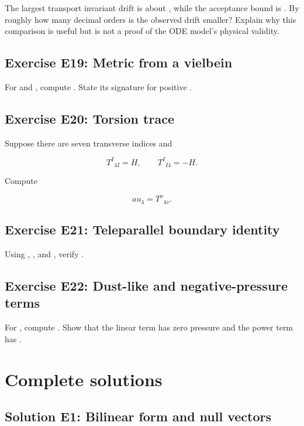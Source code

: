 \documentclass[11pt]{article}
\begin{document}
The largest transport invariant drift is about \texttt{}, while the acceptance bound is \texttt{}. By roughly how many decimal orders is the observed drift smaller? Explain why this comparison is useful but is not a proof of the ODE model's physical validity.

\subsection{Exercise E19: Metric from a vielbein}

For \texttt{} and \texttt{}, compute \texttt{}. State its signature for positive \texttt{}.

\subsection{Exercise E20: Torsion trace}

Suppose there are seven transverse indices and

\[
T^I{}_{4I}=H,
\qquad
T^I{}_{I4}=-H.
\]

Compute

\[
	au_4=T^\nu{}_{4\nu}.
\]

\subsection{Exercise E21: Teleparallel boundary identity}

Using \texttt{}, \texttt{}, and \texttt{}, verify \texttt{}.

\subsection{Exercise E22: Dust-like and negative-pressure terms}

For \texttt{}, compute \texttt{}. Show that the linear term has zero pressure and the power term has \texttt{}.

\section{Complete solutions}

\subsection{Solution E1: Bilinear form and null vectors}
\end{document}
